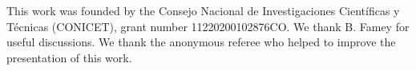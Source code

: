 \documentclass[twocolumn,twocolappendix,linenumbers]{aastex631}
\begin{document}











\begin{acknowledgments}
    This work was founded by the Consejo Nacional de Investigaciones Científicas y Técnicas (CONICET), grant number 11220200102876CO. We thank B. Famey for useful discussions. We thank the anonymous referee who helped to improve the presentation of this work.
\end{acknowledgments}

\appendix





\end{document}

